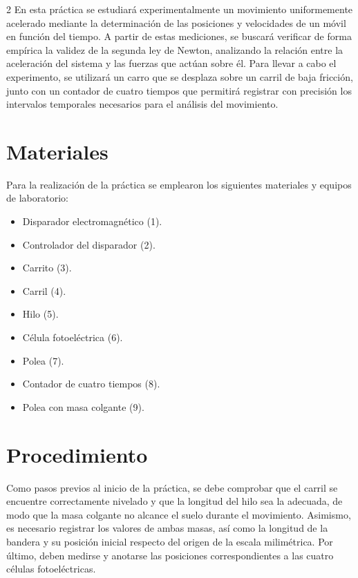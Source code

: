 \documentclass[12pt,a4paper]{article}
\begin{document}
\begin{multicols}{2}
En esta práctica se estudiará experimentalmente un movimiento uniformemente acelerado mediante la determinación de las posiciones y velocidades de un móvil en función del tiempo. A partir de estas mediciones, se buscará verificar de forma empírica la validez de la segunda ley de Newton, analizando la relación entre la aceleración del sistema y las fuerzas que actúan sobre él. Para llevar a cabo el experimento, se utilizará un carro que se desplaza sobre un carril de baja fricción, junto con un contador de cuatro tiempos que permitirá registrar con precisión los intervalos temporales necesarios para el análisis del movimiento.

\section{Materiales}

Para la realización de la práctica se emplearon los siguientes materiales y equipos de laboratorio:

\begin{itemize}
    \item Disparador electromagnético (1).
    \item Controlador del disparador (2).
    \item Carrito (3).
    \item Carril (4).
    \item Hilo (5).
    \item Célula fotoeléctrica (6).
    \item Polea (7).
    \item Contador de cuatro tiempos (8).
    \item Polea con masa colgante (9).
\end{itemize}

\section{Procedimiento}

Como pasos previos al inicio de la práctica, se debe comprobar que el carril se encuentre correctamente nivelado y que la longitud del hilo sea la adecuada, de modo que la masa colgante no alcance el suelo durante el movimiento. Asimismo, es necesario registrar los valores de ambas masas, así como la longitud de la bandera y su posición inicial respecto del origen de la escala milimétrica. Por último, deben medirse y anotarse las posiciones correspondientes a las cuatro células fotoeléctricas.


\end{multicols}
\end{document}
